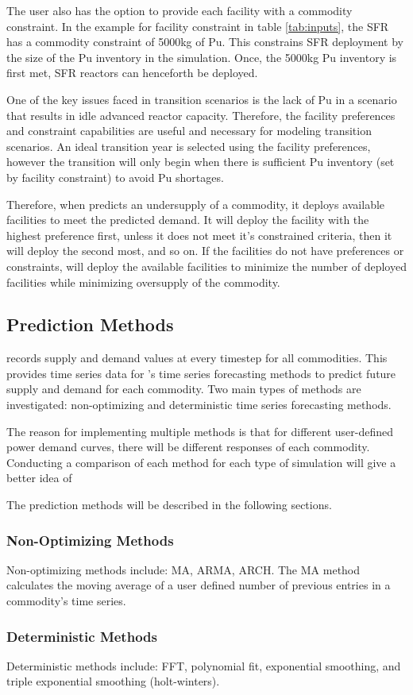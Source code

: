The user also has the option to provide each facility with a 
commodity constraint. 
In the example for facility constraint in table \ref{tab:inputs}, 
the \gls{SFR} has a commodity constraint of 5000kg of Pu. 
This constrains \gls{SFR} deployment by the size of the Pu inventory 
in the simulation. 
Once, the 5000kg Pu inventory is first met, \gls{SFR} reactors can 
henceforth be deployed. 

One of the key issues faced in transition scenarios is the lack 
of Pu in a scenario that results in idle advanced reactor capacity. 
Therefore, the facility preferences and constraint capabilities 
are useful and necessary for modeling transition scenarios. 
An ideal transition year is selected using the facility 
preferences, however the transition will only begin when there 
is sufficient Pu inventory (set by facility constraint) 
to avoid Pu shortages. 

Therefore, when \deploy predicts an undersupply of a commodity, 
it deploys available facilities to meet the predicted demand. 
It will deploy the facility with the highest preference first, 
unless it does not meet it's constrained criteria, then it will 
deploy the second most, and so on. 
If the facilities do not have preferences or constraints, \deploy 
will deploy the available facilities to minimize the number of 
deployed facilities while minimizing oversupply of the commodity.

\subsection{Prediction Methods}
\Deploy records supply and demand values at every timestep for all 
commodities. 
This provides time series data for \deploy's time series 
forecasting methods to predict future supply and demand for each 
commodity.  
Two main types of methods are investigated: non-optimizing and 
deterministic time series forecasting methods.

The reason for implementing multiple methods is that for different 
user-defined power demand curves, there will be different 
responses of each commodity. 
Conducting a comparison of each method for each type of simulation 
will give a better idea of 


The prediction methods will be described in the following 
sections. 

\subsubsection{Non-Optimizing Methods}
Non-optimizing methods include: \gls{MA}, \gls{ARMA}, 
\gls{ARCH}. 
The \gls{MA} method calculates the moving average of 
a user defined number of previous entries in a commodity's 
time series. 

\subsubsection{Deterministic Methods}
Deterministic methods include: \gls{FFT}, polynomial fit, 
exponential smoothing, and triple exponential smoothing 
(holt-winters). 

\subsection{}